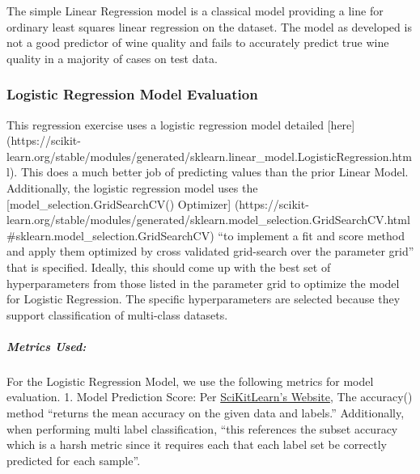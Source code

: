 \documentclass[11pt]{article}
\begin{document}
The simple Linear Regression model is a classical model providing a line
for ordinary least squares linear regression on the dataset. The model
as developed is not a good predictor of wine quality and fails to
accurately predict true wine quality in a majority of cases on test
data.

\hypertarget{logistic-regression-model-evaluation}{%
\subsubsection{Logistic Regression Model
Evaluation}\label{logistic-regression-model-evaluation}}

This regression exercise uses a logistic regression model detailed
{[}here{]}
(https://scikit-learn.org/stable/modules/generated/sklearn.linear\_model.LogisticRegression.html).
This does a much better job of predicting values than the prior Linear
Model. Additionally, the logistic regression model uses the
{[}model\_selection.GridSearchCV() Optimizer{]}
(https://scikit-learn.org/stable/modules/generated/sklearn.model\_selection.GridSearchCV.html\#sklearn.model\_selection.GridSearchCV)
``to implement a fit and score method and apply them optimized by cross
validated grid-search over the parameter grid'' that is specified.
Ideally, this should come up with the best set of hyperparameters from
those listed in the parameter grid to optimize the model for Logistic
Regression. The specific hyperparameters are selected because they
support classification of multi-class datasets.

\hypertarget{metrics-used-1}{%
\subparagraph{Metrics Used:}\label{metrics-used-1}}

For the Logistic Regression Model, we use the following metrics for
model evaluation. 1. Model Prediction Score: Per
\href{https://scikit-learn.org/stable/modules/generated/sklearn.linear_model.LogisticRegression.html\#sklearn.linear_model.LogisticRegression}{SciKitLearn's
Website}, The accuracy() method ``returns the mean accuracy on the given
data and labels.'' Additionally, when performing multi label
classification, ``this references the subset accuracy which is a harsh
metric since it requires each that each label set be correctly predicted
for each sample''.
\end{document}
